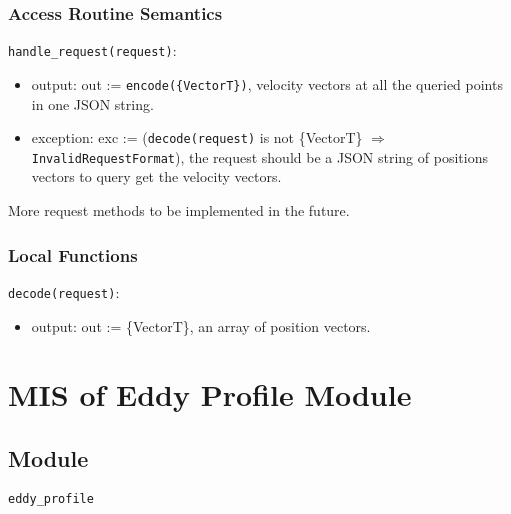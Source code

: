 \documentclass[12pt, titlepage]{article}
\begin{document}
\subsubsection{Access Routine Semantics}

\noindent \texttt{handle\_request(request)}:
\begin{itemize}
\item output: out := \texttt{encode(\{VectorT\})}, velocity vectors at all the queried points in one JSON string.
\item exception: exc := (\texttt{decode(request)} is not \{VectorT\} $\Rightarrow$ \texttt{InvalidRequestFormat}), the request should be a JSON string of positions vectors to query get the velocity vectors.
\end{itemize}
\noindent More request methods to be implemented in the future.



\subsubsection{Local Functions}


\noindent \texttt{decode(request)}:
\begin{itemize}
\item output: out := \{VectorT\}, an array of position vectors.
\end{itemize}

\newpage
\section{MIS of Eddy Profile Module} \label{mProf} 

\subsection{Module}
\texttt{eddy\_profile}
\end{document}
